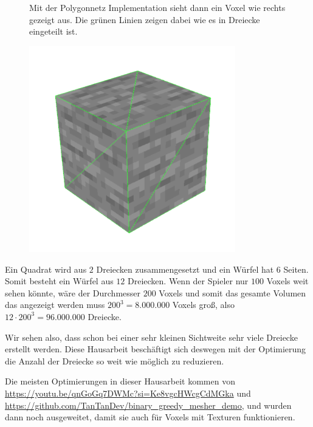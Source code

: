 \begin{figure}[ht]
	\begin{minipage}[c]{0.48\textwidth}
Mit der Polygonnetz Implementation sieht dann ein
Voxel wie rechts gezeigt aus.
Die grünen Linien zeigen dabei wie es in Dreiecke
eingeteilt ist.
	\end{minipage}
	\begin{minipage}[c]{0.5\textwidth}
		\begin{center}
\includegraphics[width=0.8\textwidth]{assets/SingleVoxel.png}
		\end{center}
	\end{minipage}\hfill
\end{figure}

\goodbreak

Ein Quadrat wird aus $2$ Dreiecken zusammengesetzt
und ein Würfel hat $6$ Seiten. Somit besteht ein Würfel
aus $12$ Dreiecken. Wenn der Spieler nur $100$ Voxels
weit sehen könnte, wäre der Durchmesser $200$ Voxels
und somit das gesamte Volumen das angezeigt werden
muss $200^3 = 8.000.000$ Voxels groß, also
$12 \cdot 200^3 = 96.000.000$ Dreiecke.

Wir sehen also, dass schon bei einer sehr kleinen
Sichtweite sehr viele Dreiecke erstellt werden.
Diese Hausarbeit beschäftigt sich deswegen mit der
Optimierung die Anzahl der Dreiecke so weit wie
möglich zu reduzieren.

Die meisten Optimierungen in dieser Hausarbeit
kommen von \url{https://youtu.be/qnGoGq7DWMc?si=Ke8vgcHWcgCdMGka}
und \url{https://github.com/TanTanDev/binary_greedy_mesher_demo},
und wurden dann noch ausgeweitet, damit sie auch für
Voxels mit Texturen funktionieren.

